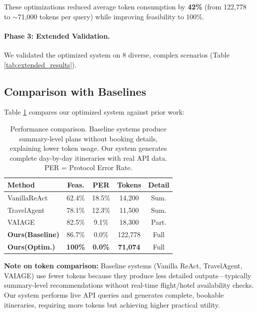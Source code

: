 \documentclass[10pt,twocolumn]{article}
\begin{document}
These optimizations reduced average token consumption by \textbf{42\%} (from 122,778 to $\sim$71,000 tokens per query) while improving feasibility to 100\%.

\paragraph{Phase 3: Extended Validation.}
We validated the optimized system on 8 diverse, complex scenarios (Table \ref{tab:extended_results}).

\subsection{Comparison with Baselines}

Table \ref{tab:main_results} compares our optimized system against prior work:

\begin{table}[h]
\centering
\begin{tabular}{lcccc}
\toprule
\textbf{Method} & \textbf{Feas.} & \textbf{PER} & \textbf{Tokens} & \textbf{Detail} \\
\midrule
Vanilla\newline ReAct & 62.4\% & 18.5\% & 14,200 & Sum. \\
TravelAgent & 78.1\% & 12.3\% & 11,500 & Sum. \\
VAIAGE & 82.5\% & 9.1\% & 18,300 & Part. \\
\textbf{Ours}\newline\textbf{(Baseline)} & 86.7\% & 0.0\% & 122,778 & Full \\
\textbf{Ours}\newline\textbf{(Optim.)} & \textbf{100\%} & \textbf{0.0\%} & \textbf{71,074} & Full \\
\bottomrule
\end{tabular}
\caption{Performance comparison. Baseline systems produce summary-level plans without booking details, explaining lower token usage. Our system generates complete day-by-day itineraries with real API data. PER = Protocol Error Rate.}
\label{tab:main_results}
\end{table}

\textbf{Note on token comparison:} Baseline systems (Vanilla ReAct, TravelAgent, VAIAGE) use fewer tokens because they produce less detailed outputs---typically summary-level recommendations without real-time flight/hotel availability checks. Our system performs live API queries and generates complete, bookable itineraries, requiring more tokens but achieving higher practical utility.
\end{document}
